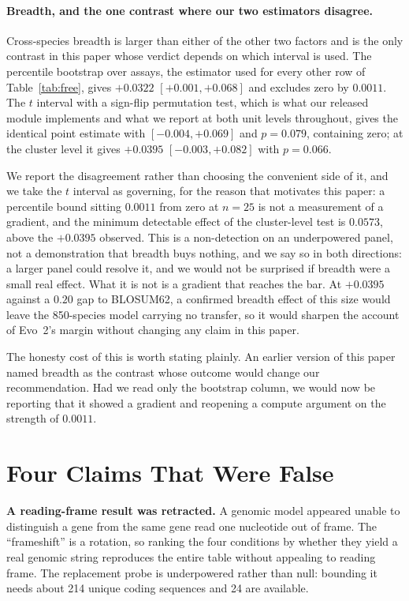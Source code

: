 \documentclass[11pt]{article}
\begin{document}
\paragraph{Breadth, and the one contrast where our two estimators disagree.}
Cross-species breadth is larger than either of the other two factors and is the only
contrast in this paper whose verdict depends on which interval is used. The
percentile bootstrap over assays, the estimator used for every other row of
Table~\ref{tab:free}, gives $+0.0322$ $[+0.001,+0.068]$ and excludes zero by
$0.0011$. The $t$ interval with a sign-flip permutation test, which is what our
released module implements and what we report at both unit levels throughout, gives
the identical point estimate with $[-0.004,+0.069]$ and $p=0.079$, containing zero;
at the cluster level it gives $+0.0395$ $[-0.003,+0.082]$ with $p=0.066$.

We report the disagreement rather than choosing the convenient side of it, and we
take the $t$ interval as governing, for the reason that motivates this paper: a
percentile bound sitting $0.0011$ from zero at $n=25$ is not a measurement of a
gradient, and the minimum detectable effect of the cluster-level test is $0.0573$,
above the $+0.0395$ observed. This is a non-detection on an underpowered panel, not
a demonstration that breadth buys nothing, and we say so in both directions: a larger
panel could resolve it, and we would not be surprised if breadth were a small real
effect. What it is not is a gradient that reaches the bar. At $+0.0395$ against a
$0.20$ gap to BLOSUM62, a confirmed breadth effect of this size would leave the
850-species model carrying no transfer, so it would sharpen the account of Evo~2's
margin without changing any claim in this paper.

The honesty cost of this is worth stating plainly. An earlier version of this paper
named breadth as the contrast whose outcome would change our recommendation. Had we
read only the bootstrap column, we would now be reporting that it showed a gradient
and reopening a compute argument on the strength of $0.0011$.

\section{Four Claims That Were False}
\label{sec:retract}

\textbf{A reading-frame result was retracted.} A genomic model appeared unable to
distinguish a gene from the same gene read one nucleotide out of frame. The
``frameshift'' is a rotation, so ranking the four conditions by whether they yield
a real genomic string reproduces the entire table without appealing to reading
frame. The replacement probe is underpowered rather than null: bounding it needs
about 214 unique coding sequences and 24 are available.
\end{document}
